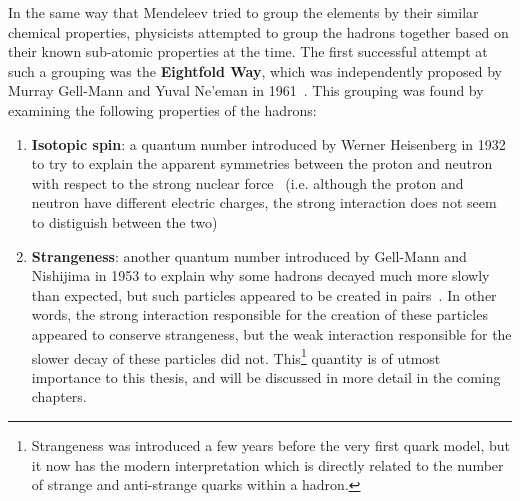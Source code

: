 In the same way that Mendeleev tried to group the elements by their similar chemical properties, physicists attempted to group the hadrons together based on their known sub-atomic properties at the time. The first successful attempt at such a grouping was the \textbf{Eightfold Way}, which was independently proposed by Murray Gell-Mann and Yuval Ne'eman in 1961~\cite{GellMannEightfold, NeemanEightfold}. This grouping was found by examining the following properties of the hadrons:
%
\begin{enumerate}
    \item \textbf{Isotopic spin}: a quantum number introduced by Werner Heisenberg in 1932 to try to explain the apparent symmetries between the proton and neutron with respect to the strong nuclear force~\cite{IsotopicSpin} (i.e. although the proton and neutron have different electric charges, the strong interaction does not seem to distiguish between the two)
    \item \textbf{Strangeness}: another quantum number introduced by Gell-Mann and Nishijima in 1953 to explain why some hadrons decayed much more slowly than expected, but such particles appeared to be created in pairs~\cite{Strangeness}. In other words, the strong interaction responsible for the creation of these particles appeared to conserve strangeness, but the weak interaction responsible for the slower decay of these particles did not. This\footnote{Strangeness was introduced a few years before the very first quark model, but it now has the modern interpretation which is directly related to the number of strange and anti-strange quarks within a hadron.} quantity is of utmost importance to this thesis, and will be discussed in more detail in the coming chapters.
\end{enumerate}
%
